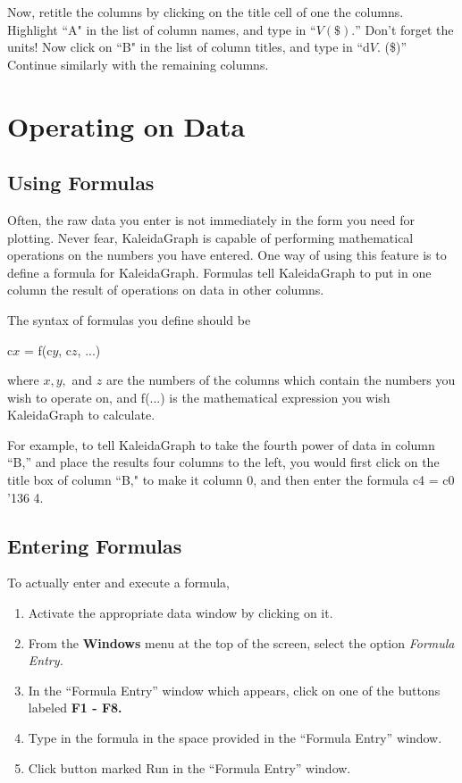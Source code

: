 \documentclass[12pt]{article}
\begin{document}
Now, retitle the columns by clicking on the title cell of one the columns. Highlight
``A" in the list of column names, and type in ``$V (\$).$'' Don't forget the
units! Now click on ``B" in the list of column titles, and type in ``d$V.$ (\$)''
Continue similarly with the remaining columns.

\section{Operating on Data}
\subsection{Using Formulas}

Often, the raw data you enter is not immediately in the form you need for plotting.
Never fear, KaleidaGraph is capable of performing mathematical operations on the
numbers you have entered. One way of using this feature is to define a formula for
KaleidaGraph. Formulas tell KaleidaGraph to put in one column the result of operations
on data in other columns.

The syntax of formulas you define should be
\begin{center}
c$x$ = f(c$y$, c$z$, ...)
\end{center}
where $x, y,$ and $z$ are the numbers of the columns which contain the numbers you
wish to operate on, and f(...) is the mathematical expression you wish KaleidaGraph to
calculate.

For example, to tell KaleidaGraph to take the fourth power of data in column ``B,''
and place the results four columns to the left, you would first click on the title box
of column ``B," to make it column 0, and then enter the formula c4 = c0 \char'136 4.

\subsection{Entering Formulas}

To actually enter and execute a formula, 

\noindent
\begin{enumerate}
\item Activate the appropriate data window by clicking on it.
\item From the {\bf Windows} menu at the top of the screen, select the option {\it
Formula Entry.}
\item In the ``Formula Entry'' window which appears, click on one of the buttons 
labeled {\bf F1 - F8.}
\item Type in the formula in the space provided in the ``Formula Entry'' window.
\item Click button marked Run in the ``Formula Entry'' window.
\end{enumerate}
\indent
\end{document}
